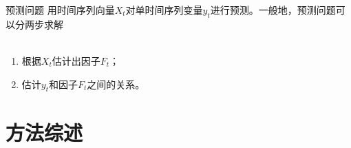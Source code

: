 \documentclass{beamer}
\begin{document}
\begin{frame}{预测问题}
	用时间序列向量$X_t$对单时间序列变量$y_t$进行预测。一般地，预测问题可以分两步求解\parencite{stock2002forecasting}
	\\~\\
	\begin{enumerate}
		\setlength\itemsep{1em}
		\item 根据$X_t$估计出因子$F_t$；
		\item 估计$y_t$和因子$F_t$之间的关系。
	\end{enumerate}
\end{frame}



\section{方法综述}
%
\end{document}
